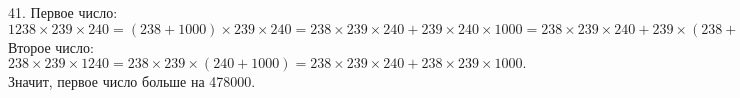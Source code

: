 41. Первое число: $1238\times239\times240=(238+1000)\times239\times240=238\times239\times240+239\times240\times1000=238\times239\times240+239\times(238+2)\times1000=
238\times239\times240+239\times238\times1000+239\times2\times1000=238\times239\times240+239\times238\times1000+478000.$ Второе число: $238\times239\times1240=238\times239\times(240+1000)=238\times239\times240+238\times239\times1000.$ Значит, первое число больше на 478000.\\
